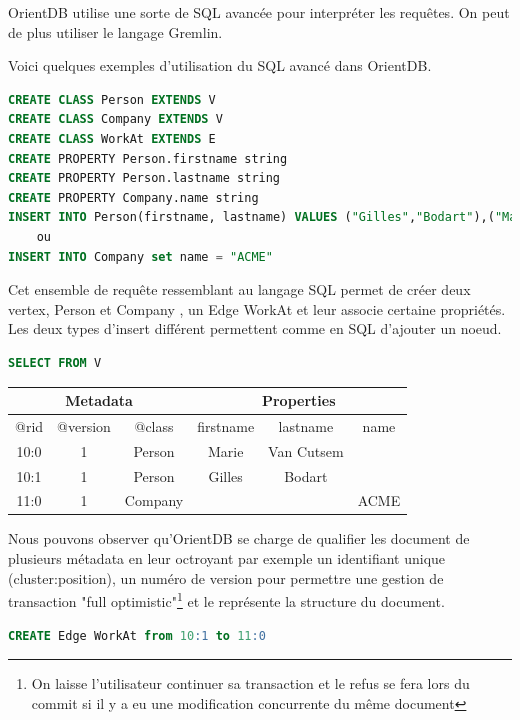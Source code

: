 \documentclass[a4paper,fleqn,12pt]{report}
\begin{document}
OrientDB utilise une sorte de SQL avancée pour interpréter les requêtes. On peut de plus utiliser le langage Gremlin.

Voici quelques exemples d'utilisation du SQL avancé dans OrientDB.

\begin{lstlisting}[language=SQL]
CREATE CLASS Person EXTENDS V
CREATE CLASS Company EXTENDS V
CREATE CLASS WorkAt EXTENDS E
CREATE PROPERTY Person.firstname string
CREATE PROPERTY Person.lastname string
CREATE PROPERTY Company.name string
INSERT INTO Person(firstname, lastname) VALUES ("Gilles","Bodart"),("Marie","Van Cutsem")
	ou
INSERT INTO Company set name = "ACME"

\end{lstlisting}

Cet ensemble de requête ressemblant au langage SQL permet de créer deux vertex, Person et Company , un Edge WorkAt et leur associe certaine propriétés. Les deux types d'insert différent permettent comme en SQL d'ajouter un noeud.  

\begin{lstlisting}[language=SQL]
SELECT FROM V
\end{lstlisting}
\begin{center}
	\begin{tabular}{|c|c|c|c|c|c|}
   		\hline
  		\multicolumn{3}{|c|}{Metadata} & \multicolumn{3}{c|}{Properties} \\
   		\hline
   		@rid & @version & @class & firstname & lastname & name \\
   		\hline
   		10:0 & 1 & Person & Marie & Van Cutsem &  \\
   		10:1 & 1 & Person & Gilles & Bodart &  \\
   		11:0 & 1 & Company &  &  & ACME \\
   		\hline
	\end{tabular}
\end{center}

Nous pouvons observer qu'OrientDB se charge de qualifier les document de plusieurs métadata en leur octroyant par exemple un identifiant unique (\no cluster:position), un numéro de version pour permettre une gestion de transaction "full optimistic"\footnote{On laisse l'utilisateur continuer sa transaction et le refus se fera lors du commit si il y a eu une modification concurrente du même document} et le \@class représente la structure du document.

\begin{lstlisting}[language=SQL]
CREATE Edge WorkAt from 10:1 to 11:0
\end{lstlisting}
\end{document}
